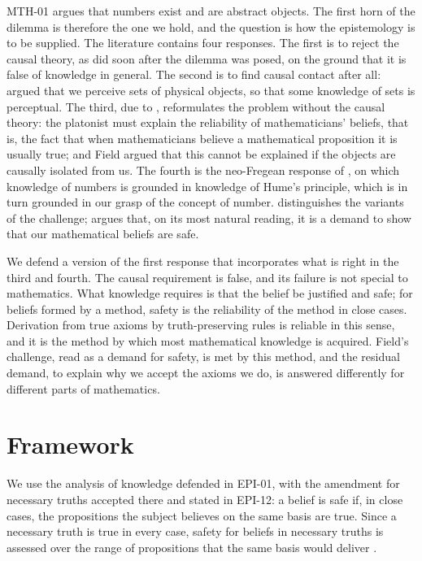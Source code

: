\documentclass{situationist-preprint}
\begin{document}
MTH-01 argues that numbers exist and are abstract objects. The first horn of the dilemma is therefore the one we hold, and the question is how the epistemology is to be supplied. The literature contains four responses. The first is to reject the causal theory, as \citet{Steiner1973} did soon after the dilemma was posed, on the ground that it is false of knowledge in general. The second is to find causal contact after all: \citet{Maddy1990} argued that we perceive sets of physical objects, so that some knowledge of sets is perceptual. The third, due to \citet{Field1989}, reformulates the problem without the causal theory: the platonist must explain the reliability of mathematicians' beliefs, that is, the fact that when mathematicians believe a mathematical proposition it is usually true; and Field argued that this cannot be explained if the objects are causally isolated from us. The fourth is the neo-Fregean response of \citet{HaleWright2002}, on which knowledge of numbers is grounded in knowledge of Hume's principle, which is in turn grounded in our grasp of the concept of number. \citet{Linnebo2006} distinguishes the variants of the challenge; \citet{ClarkeDoane2017} argues that, on its most natural reading, it is a demand to show that our mathematical beliefs are safe.

We defend a version of the first response that incorporates what is right in the third and fourth. The causal requirement is false, and its failure is not special to mathematics. What knowledge requires is that the belief be justified and safe; for beliefs formed by a method, safety is the reliability of the method in close cases. Derivation from true axioms by truth-preserving rules is reliable in this sense, and it is the method by which most mathematical knowledge is acquired. Field's challenge, read as a demand for safety, is met by this method, and the residual demand, to explain why we accept the axioms we do, is answered differently for different parts of mathematics.

\section{Framework}

We use the analysis of knowledge defended in EPI-01, with the amendment for necessary truths accepted there and stated in EPI-12: a belief is safe if, in close cases, the propositions the subject believes on the same basis are true. Since a necessary truth is true in every case, safety for beliefs in necessary truths is assessed over the range of propositions that the same basis would deliver \citep{Pritchard2005,Williamson2000}.
\end{document}
